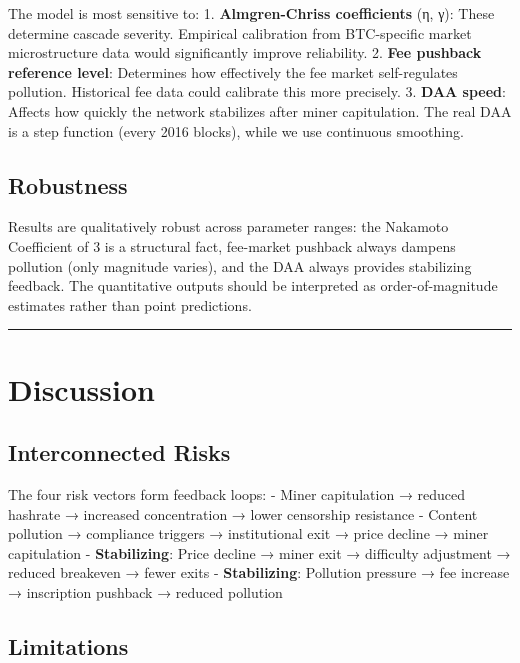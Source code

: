 \documentclass[
  11pt,
]{article}
\let\oldsection\section
\renewcommand{\section}[1]{\FloatBarrier\oldsection{#1}}
\let\oldsubsection\subsection
\renewcommand{\subsection}[1]{\FloatBarrier\oldsubsection{#1}}
\begin{document}
The model is most sensitive to: 1. \textbf{Almgren-Chriss coefficients}
(η, γ): These determine cascade severity. Empirical calibration from
BTC-specific market microstructure data would significantly improve
reliability. 2. \textbf{Fee pushback reference level}: Determines how
effectively the fee market self-regulates pollution. Historical fee data
could calibrate this more precisely. 3. \textbf{DAA speed}: Affects how
quickly the network stabilizes after miner capitulation. The real DAA is
a step function (every 2016 blocks), while we use continuous smoothing.

\hypertarget{robustness}{%
\subsection{Robustness}\label{robustness}}

Results are qualitatively robust across parameter ranges: the Nakamoto
Coefficient of 3 is a structural fact, fee-market pushback always
dampens pollution (only magnitude varies), and the DAA always provides
stabilizing feedback. The quantitative outputs should be interpreted as
order-of-magnitude estimates rather than point predictions.

\begin{center}\rule{0.5\linewidth}{0.5pt}\end{center}

\hypertarget{discussion}{%
\section{Discussion}\label{discussion}}

\hypertarget{interconnected-risks}{%
\subsection{Interconnected Risks}\label{interconnected-risks}}

The four risk vectors form feedback loops: - Miner capitulation →
reduced hashrate → increased concentration → lower censorship resistance
- Content pollution → compliance triggers → institutional exit → price
decline → miner capitulation - \textbf{Stabilizing}: Price decline →
miner exit → difficulty adjustment → reduced breakeven → fewer exits -
\textbf{Stabilizing}: Pollution pressure → fee increase → inscription
pushback → reduced pollution

\hypertarget{limitations-1}{%
\subsection{Limitations}\label{limitations-1}}
\end{document}
